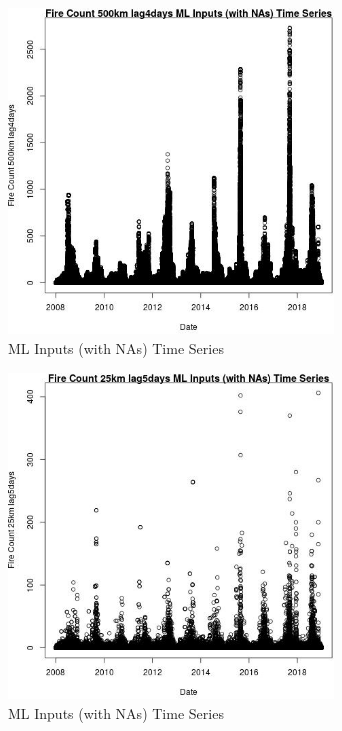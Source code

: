 \begin{figure} 
\centering  
\includegraphics[width=0.77\textwidth]{Code_Outputs/Report_ML_input_PM25_Step4_part_f_de_duplicated_aves_prioritize_24hr_obswNAs_Fire_Count_500km_lag4daysvDate.jpg} 
\caption{\label{fig:Report_ML_input_PM25_Step4_part_f_de_duplicated_aves_prioritize_24hr_obswNAsFire_Count_500km_lag4daysvDate}ML Inputs (with NAs) Time Series} 
\end{figure} 
 

\begin{figure} 
\centering  
\includegraphics[width=0.77\textwidth]{Code_Outputs/Report_ML_input_PM25_Step4_part_f_de_duplicated_aves_prioritize_24hr_obswNAs_Fire_Count_25km_lag5daysvDate.jpg} 
\caption{\label{fig:Report_ML_input_PM25_Step4_part_f_de_duplicated_aves_prioritize_24hr_obswNAsFire_Count_25km_lag5daysvDate}ML Inputs (with NAs) Time Series} 
\end{figure} 
 

